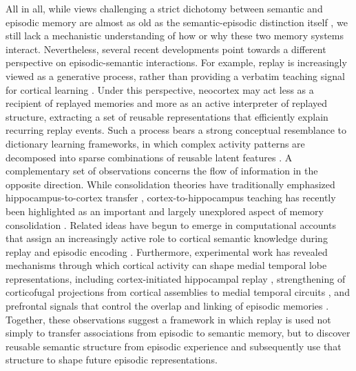 \documentclass{article}
\begin{document}
All in all, while views challenging a strict dichotomy between semantic and episodic memory are almost as old as the semantic-episodic distinction itself , we still lack a mechanistic understanding of how or why these two memory systems interact. Nevertheless, several recent developments point towards a different perspective on episodic-semantic interactions. For example, replay is increasingly viewed as a generative process, rather than providing a verbatim teaching signal for cortical learning . Under this perspective, neocortex may act less as a recipient of replayed memories and more as an active interpreter of replayed structure, extracting a set of reusable representations that efficiently explain recurring replay events. Such a process bears a strong conceptual resemblance to dictionary learning frameworks, in which complex activity patterns are decomposed into sparse combinations of reusable latent features . A complementary set of observations concerns the flow of information in the opposite direction. While consolidation theories have traditionally emphasized hippocampus-to-cortex transfer , cortex-to-hippocampus teaching has recently been highlighted as an important and largely unexplored aspect of memory consolidation . Related ideas have begun to emerge in computational accounts that assign an increasingly active role to cortical semantic knowledge during replay  and episodic encoding . Furthermore, experimental work has revealed mechanisms through which cortical activity can shape medial temporal lobe representations, including cortex-initiated hippocampal replay , strengthening of corticofugal projections from cortical assemblies to medial temporal circuits , and prefrontal signals that control the overlap and linking of episodic memories .  Together, these observations suggest a framework in which replay is used not simply to transfer associations from episodic to semantic memory, but to discover reusable semantic structure from episodic experience and subsequently use that structure to shape future episodic representations.
\newline\newline
\end{document}
